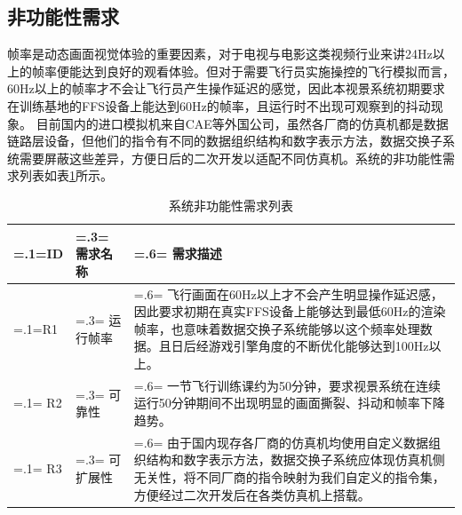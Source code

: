 \subsection{非功能性需求}
帧率是动态画面视觉体验的重要因素，对于电视与电影这类视频行业来讲24Hz以上的帧率便能达到良好的观看体验\cite{frame}。但对于需要飞行员实施操控的飞行模拟而言，60Hz以上的帧率才不会让飞行员产生操作延迟的感觉，因此本视景系统初期要求在训练基地的FFS设备上能达到60Hz的帧率，且运行时不出现可观察到的抖动现象。
目前国内的进口模拟机来自CAE等外国公司，虽然各厂商的仿真机都是数据链路层设备，但他们的指令有不同的数据组织结构和数字表示方法，数据交换子系统需要屏蔽这些差异，方便日后的二次开发以适配不同仿真机。系统的非功能性需求列表如表\ref{unfuncreq}所示。
\begin{table}[h!]
    \begin{center}
        \caption{系统非功能性需求列表}
        \label{unfuncreq}
        \renewcommand\arraystretch{1.5}
        \begin{tabularx}{\textwidth}{ 
            | >{\centering\arraybackslash\hsize=.1\hsize\linewidth=\hsize}X 
            | >{\centering\arraybackslash\hsize=.3\hsize\linewidth=\hsize}X 
            | >{\raggedright\arraybackslash\hsize=.6\hsize\linewidth=\hsize}X 
            | }
            \hline
            \textbf{ID} & \textbf{需求名称} & \textbf{需求描述}\\
            \hline
            R1 & 运行帧率 & 飞行画面在60Hz以上才不会产生明显操作延迟感，因此要求初期在真实FFS设备上能够达到最低60Hz的渲染帧率，也意味着数据交换子系统能够以这个频率处理数据。且日后经游戏引擎角度的不断优化能够达到100Hz以上。\\
            \hline
            R2 & 可靠性 & 一节飞行训练课约为50分钟，要求视景系统在连续运行50分钟期间不出现明显的画面撕裂、抖动和帧率下降趋势。\\
            \hline
            R3 & 可扩展性 & 由于国内现存各厂商的仿真机均使用自定义数据组织结构和数字表示方法，数据交换子系统应体现仿真机侧无关性，将不同厂商的指令映射为我们自定义的指令集，方便经过二次开发后在各类仿真机上搭载。\\
            \hline
        \end{tabularx}
    \end{center}
\end{table}

